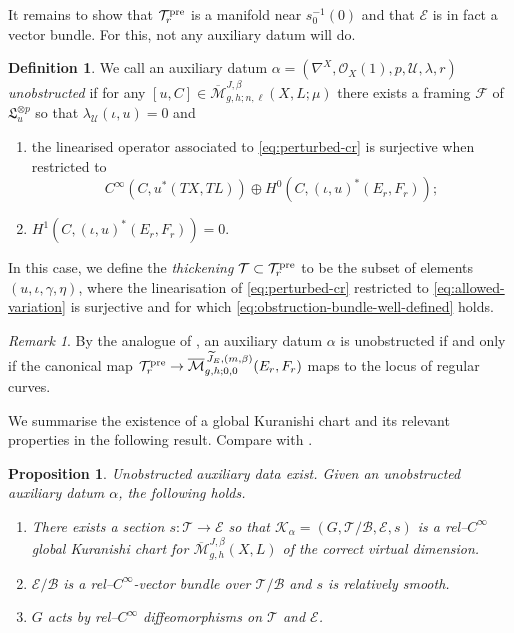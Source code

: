 \documentclass[11pt,psamsfonts, oneside, reqno]{amsart}
\newcommand{\sub}{\subset}%
\newcommand{\inv}{^{-1}}
\newcommand{\cl}{\colon}
\newcommand{\conn}{\nabla}
\newcommand{\Mbar}{\overline{\mathcal M}}
\newcommand{\cB}{\mathcal{B}}
\newcommand{\cE}{\mathcal{E}}
\newcommand{\cF}{\mathcal{F}}
\newcommand{\cK}{\mathcal{K}}
\newcommand{\cO}{\mathcal{O}}
\newcommand{\cT}{\mathcal{T}}
\newcommand{\cU}{\mathcal{U}}
\newcommand{\fL}{\mathfrak{L}}
\newcommand{\wt}{\widetilde}
\newcommand{\obs}{s}
\newtheorem{proposition}[theorem]{Proposition}
\theoremstyle{definition}
\newtheorem{definition}[theorem]{Definition}
\theoremstyle{remark}
\newtheorem{remark}[theorem]{Remark}
\numberwithin{equation}{section}
\begin{document}
\noindent
It remains to show that $\cT^{\normalfont\text{pre}}_r$ is a manifold near $\obs_0\inv(0)$ and that $\cE$ is in fact a vector bundle. For this, not any auxiliary datum will do.

\begin{definition}\label{de:unobstruced-aux} We call an auxiliary datum $\alpha = (\conn^X,\cO_X(1),p,\cU,\lambda,r)$ \emph{unobstructed} if for any $[u,C]\in \Mbar^{J,\beta}_{g,h;n,\ell}(X,L;\mu)$ there exists a framing $\cF$ of $\fL_u^{\otimes p}$ so that $\lambda_\cU(\iota,u) = 0$ and
	\begin{enumerate}[label=\roman*),leftmargin=20pt,ref=\roman*]
		\item the linearised operator associated to \eqref{eq:perturbed-cr} is surjective when restricted to 
		\begin{equation}\label{eq:allowed-variation}
			C^\infty(C,u^*(TX,TL))\oplus H^0(C,(\iota,u)^*(E_r,F_r));
		\end{equation}
		\item\label{eq:obstruction-bundle-well-defined} $H^1(C,(\iota,u)^*(E_r,F_r)) = 0$.
	\end{enumerate}
	In this case, we define the \emph{thickening} $\cT\sub \cT^{\normalfont\text{pre}}_r$ to be the subset of elements $(u,\iota,\gamma,\eta)$, where the linearisation of \eqref{eq:perturbed-cr} restricted to \eqref{eq:allowed-variation} is surjective and for which \eqref{eq:obstruction-bundle-well-defined} holds.
\end{definition}

\begin{remark}\label{lem:unobstructedness-differently} By the analogue of \cite[Lemma~4.17]{HS22}, an auxiliary datum $\alpha$ is unobstructed if and only if the canonical map $\cT^{\normalfont\text{pre}}_r\to \Mbar_{g,h;0,0}^{\,\wt J_E,(m,\beta)}(E_r,F_r)$
	maps to the locus of regular curves.
\end{remark}

\noindent
We summarise the existence of a global Kuranishi chart and its relevant properties in the following result. Compare with \cite[Proposition~5.1]{HS22}.

\begin{proposition}\label{prop:open-gw-global-chart-existence} Unobstructed auxiliary data exist. Given an unobstructed auxiliary datum $\alpha$, the following holds.
	\begin{enumerate}[label = \arabic*), leftmargin=20pt,ref=\arabic*]
		\item\label{gkc-indeed} There exists a section $\obs \cl \cT\to \cE$ so that $\cK_\alpha = (G,\cT/\cB,\cE,\obs)$ is a rel--$C^\infty$ global Kuranishi chart for $\Mbar_{g,h}^{J,\beta}(X,L)$ of the correct virtual dimension.
		\item\label{rel-smooth-obstruction-bundle} $\cE/\cB$ is a rel--$C^\infty$-vector bundle over $\cT/\cB$ and $\obs$ is relatively smooth.
		\item\label{rel-smooth-action} $G$ acts by rel--$C^\infty$ diffeomorphisms on $\cT$ and $\cE$.
	\end{enumerate}
\end{proposition}
\end{document}
